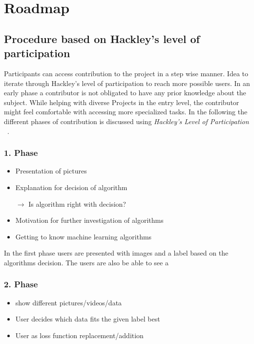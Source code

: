 \chapter{Roadmap}\label{ch:examples}

\section{Procedure based on Hackley's level of participation}

Participants can access contribution to the project in a step wise manner. 
Idea to iterate through Hackley's level of participation to reach more possible users.
In an early phase a contributor is not obligated to have any prior knowledge about the subject.
While helping with diverse Projects in the entry level, the contributor might feel comfortable
with accessing more specialized tasks. In the following the different phases of contribution is discussed
using \glqq \textit{Hackley's Level of Participation} \ \grqq.

\subsection{1. Phase}  
\begin{itemize}
    \item Presentation of pictures
    \item Explanation for decision of algorithm
    
    $\rightarrow$ Is algorithm right with decision?
    \item Motivation for further investigation of algorithms
    \item Getting to know machine learning algorithms
\end{itemize}

In the first phase users are presented with images and a label based on the algorithms decision.
The users are also be able to see a


\subsection{2. Phase}

\begin{itemize}
    \item show different pictures/videos/data
    \item User decides which data fits the given label best
    \item User as loss function replacement/addition
\end{itemize}

